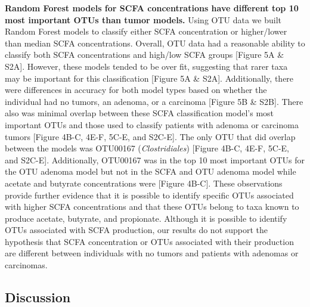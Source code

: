 \documentclass[11pt,]{article}
\begin{document}
\textbf{Random Forest models for SCFA concentrations have different top
10 most important OTUs than tumor models.} Using OTU data we built
Random Forest models to classify either SCFA concentration or
higher/lower than median SCFA concentrations. Overall, OTU data had a
reasonable ability to classify both SCFA concentrations and high/low
SCFA groups {[}Figure 5A \& S2A{]}. However, these models tended to be
over fit, suggesting that rarer taxa may be important for this
classification {[}Figure 5A \& S2A{]}. Additionally, there were
differences in accuracy for both model types based on whether the
individual had no tumors, an adenoma, or a carcinoma {[}Figure 5B \&
S2B{]}. There also was minimal overlap between these SCFA classification
model's most important OTUs and those used to classify patients with
adenoma or carcinoma tumors {[}Figure 4B-C, 4E-F, 5C-E, and S2C-E{]}.
The only OTU that did overlap between the models was OTU00167
(\emph{Clostridiales}) {[}Figure 4B-C, 4E-F, 5C-E, and S2C-E{]}.
Additionally, OTU00167 was in the top 10 most important OTUs for the OTU
adenoma model but not in the SCFA and OTU adenoma model while acetate
and butyrate concentrations were {[}Figure 4B-C{]}. These observations
provide further evidence that it is possible to identify specific OTUs
associated with higher SCFA concentrations and that these OTUs belong to
taxa known to produce acetate, butyrate, and propionate. Although it is
possible to identify OTUs associated with SCFA production, our results
do not support the hypothesis that SCFA concentration or OTUs associated
with their production are different between individuals with no tumors
and patients with adenomas or carcinomas.

\newpage

\subsection{Discussion}\label{discussion}
\end{document}
